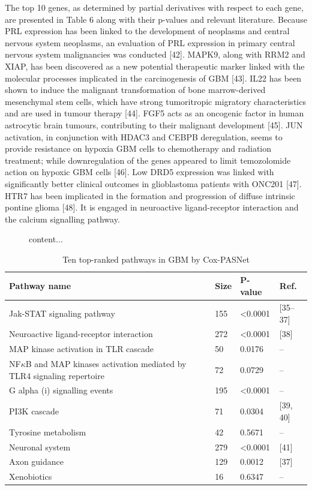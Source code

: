 \documentclass[10pt,twocolumn,twoside,lineno]{gsajnl}
\begin{document}
The top 10 genes, as determined by partial derivatives with respect to each gene, are presented in Table 6 along with their p-values and relevant literature. Because PRL expression has been linked to the development of neoplasms and central nervous system neoplasms, an evaluation of PRL expression in primary central nervous system malignancies was conducted [42]. MAPK9, along with RRM2 and XIAP, has been discovered as a new potential therapeutic marker linked with the molecular processes implicated in the carcinogenesis of GBM [43]. IL22 has been shown to induce the malignant transformation of bone marrow-derived mesenchymal stem cells, which have strong tumoritropic migratory characteristics and are used in tumour therapy [44]. FGF5 acts as an oncogenic factor in human astrocytic brain tumours, contributing to their malignant development [45]. JUN activation, in conjunction with HDAC3 and CEBPB deregulation, seems to provide resistance on hypoxia GBM cells to chemotherapy and radiation treatment; while downregulation of the genes appeared to limit temozolomide action on hypoxic GBM cells [46]. Low DRD5 expression was linked with significantly better clinical outcomes in glioblastoma patients with ONC201 [47]. HTR7 has been implicated in the formation and progression of diffuse intrinsic pontine glioma [48]. It is engaged in neuroactive ligand-receptor interaction and the calcium signalling pathway.

\begin{figure}
	content...
\end{figure}


\begin{table}[t]
	\centering
	\caption{Ten top-ranked pathways in GBM by Cox-PASNet}
	\begin{tableminipage}{\textwidth}
		\begin{tabularx}{\textwidth}{p{350pt}p{50pt}p{50pt}p{50pt}}%
			\hline
			{\bf Pathway name} & {\bf Size} & {\bf P-value} & {\bf Ref.} \\
			\hline
			
			Jak-STAT signaling pathway & 155 & <0.0001 & [35–37] \\
			Neuroactive ligand-receptor interaction & 272 & <0.0001 & [38] \\
			MAP kinase activation in TLR cascade & 50 & 0.0176 & – \\
			NF$\kappa$B and MAP kinases activation mediated by TLR4 signaling repertoire & 72 & 0.0729 & – \\
			G alpha (i) signalling events & 195 & <0.0001 & – \\
			PI3K cascade & 71 & 0.0304 & [39, 40] \\
			Tyrosine metabolism & 42 & 0.5671 & – \\
			Neuronal system & 279 & <0.0001 & [41] \\
			Axon guidance & 129 & 0.0012 & [37] \\
			Xenobiotics & 16 & 0.6347 & – \\
			\hline
		\end{tabularx}
		\label{tab:shape-functions}
	\end{tableminipage}
\end{table}
\end{document}

